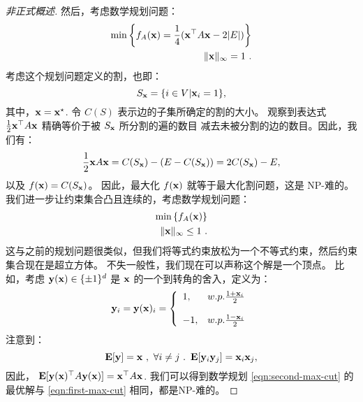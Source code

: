 \begin{proof}[
非正式概述
]
然后，考虑数学规划问题：
\begin{align}\label{eqn:first-max-cut}
\min  \left\{ f_A(\mathbf x) = \frac{1}{4} ( \mathbf x^\top A \mathbf x  - 2 |E| ) \right\} \\
\|\mathbf x\|_\infty = 1  \ .  \notag
\end{align}
考虑这个规划问题定义的割，也即：
$$ S_{\mathbf x}  = \{ i \in V |  \mathbf x_i = 1 \}  , $$
其中，$\mathbf x = \mathbf x^\star$. 
令 $C(S)$ 表示边的子集所确定的割的大小。 
观察到表达式  $\frac{1}{2} \mathbf x ^\top A \mathbf x$ 精确等价于被 $S_{\mathbf x}$ 所分割的遍的数目 减去未被分割的边的数目。因此，我们有：
$$ \frac{1}{2}  \mathbf x A \mathbf x =  C(S_{\mathbf x}) -  (E - C(S_{\mathbf x})) = 2 C(S_{\mathbf x}) - E , $$
以及 $f(\mathbf x) = C(S_{\mathbf x})$。
因此，最大化  $f(\mathbf x)$ 就等于最大化割问题，这是 NP-难的。
我们进一步让约束集合凸且连续的，考虑数学规划问题：
\begin{align} \label{eqn:second-max-cut}
\min  \left \{  f_A(\mathbf x)  \right\} \\
\|\mathbf x\|_\infty \leq 1 \ .  \notag
\end{align}
这与之前的规划问题很类似，但我们将等式约束放松为一个不等式约束，然后约束集合现在是超立方体。
不失一般性，我们现在可以声称这个解是一个顶点。
比如，考虑 $\mathbf y(\mathbf x) \in \{ \pm 1\}^d$ 是 $\mathbf x$ 的一个到转角的舍入，定义为：
$$ \mathbf y_i =  \mathbf y(\mathbf x)_i = { \left\{ \begin{array}{ll} { 1 }, & { w.p. \frac{1 + \mathbf x_i}{2} } \\\\ {-1}, & {w.p. \frac{1- \mathbf x_i}{2} } \end{array} \right. }  $$ 
注意到：
$$ \mathop{\mbox{\bf E}}[ \mathbf y] = \mathbf x \ , \  \forall i \neq j \  . \ \mathop{\mbox{\bf E}}[ \mathbf y_i \mathbf y_j] = \mathbf x_i \mathbf x_j , $$
因此，
$\mathop{\mbox{\bf E}}[ \mathbf y(\mathbf x) ^\top A \mathbf y(\mathbf x) ] = \mathbf x^\top A \mathbf x $. 
我们可以得到数学规划 \ref{eqn:second-max-cut} 的最优解与  \ref{eqn:first-max-cut} 相同，都是NP-难的。
\end{proof}
